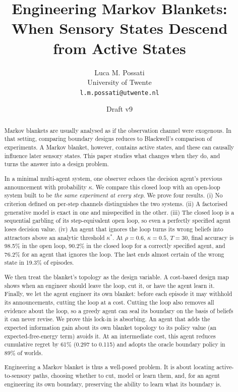 \documentclass[11pt]{article}
\title{\textbf{Engineering Markov Blankets:\\ When Sensory States Descend from Active States}}
\author{Luca M. Possati\\ {\small University of Twente}\\ {\small\texttt{l.m.possati@utwente.nl}}}
\date{Draft v9}
\theoremstyle{definition}
\theoremstyle{remark}
\begin{document}
\maketitle

\begin{abstract}
\noindent Markov blankets are usually analysed as if the observation channel were
exogenous. In that setting, comparing boundary designs reduces to Blackwell's
comparison of experiments. A Markov blanket, however, contains active states,
and these can causally influence later sensory states. This paper studies what
changes when they do, and turns the answer into a design problem.

In a minimal multi-agent system, one observer echoes the decision agent's
previous announcement with probability $\kappa$. We compare this closed loop
with an open-loop system built to be \emph{the same experiment at every step}.
We prove four results.
(i) No criterion defined on per-step channels distinguishes the two systems.
(ii) A factorised generative model is exact in one and misspecified in the
other.
(iii) The closed loop is a sequential garbling of its step-equivalent open loop,
so even a perfectly specified agent loses decision value.
(iv) An agent that ignores the loop turns its wrong beliefs into attractors above
an analytic threshold $\kappa^\ast$.
At $\rho=0.6$, $\kappa=0.5$, $T=30$, final accuracy is 98.5\% in the open loop,
90.2\% in the closed loop for a correctly specified agent, and 76.2\% for an
agent that ignores the loop. The last ends almost certain of the wrong state in
19.3\% of episodes.

We then treat the blanket's topology as the design variable. A cost-based design
map shows when an engineer should leave the loop, cut it, or have the agent learn
it. Finally, we let the agent engineer its own blanket: before each episode it
may withhold its announcements, cutting the loop at a cost. Cutting the loop
also removes all evidence about the loop, so a greedy agent can seal its
boundary on the basis of beliefs it can never revise. We prove this lock-in is
absorbing. An agent that adds the expected information gain about its own
blanket topology to its policy value (an expected-free-energy term) avoids it.
At an intermediate cost, this agent reduces cumulative regret by 61\% (0.297 to
0.115) and adopts the oracle boundary policy in 89\% of worlds.

Engineering a Markov blanket is thus a well-posed problem. It is about locating
active-to-sensory paths, choosing whether to cut, model or learn them, and, for
an agent engineering its own boundary, preserving the ability to learn what its
boundary is.
\end{abstract}
\end{document}
